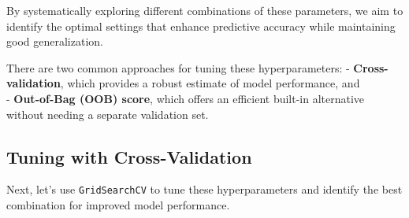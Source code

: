 \documentclass[
  letterpaper,
  DIV=11,
  numbers=noendperiod]{scrreprt}
\begin{document}
By systematically exploring different combinations of these parameters,
we aim to identify the optimal settings that enhance predictive accuracy
while maintaining good generalization.

There are two common approaches for tuning these hyperparameters: -
\textbf{Cross-validation}, which provides a robust estimate of model
performance, and\\
- \textbf{Out-of-Bag (OOB) score}, which offers an efficient built-in
alternative without needing a separate validation set.

\subsection{Tuning with
Cross-Validation}\label{tuning-with-cross-validation}

Next, let's use \texttt{GridSearchCV} to tune these hyperparameters and
identify the best combination for improved model performance.
\end{document}
